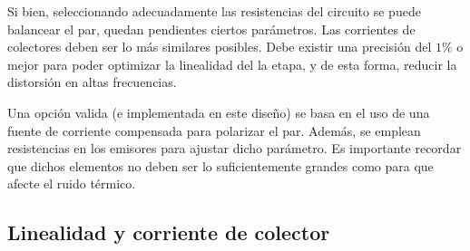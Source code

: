 Si bien, seleccionando adecuadamente las resistencias del circuito se puede balancear el par, quedan pendientes ciertos parámetros. Las corrientes de colectores deben ser lo más similares posibles. Debe existir una precisión del $1\%$ o mejor para poder optimizar la linealidad del la etapa, y de esta forma, reducir la distorsión en altas frecuencias.
%

Una opción valida (e implementada en este diseño) se basa en el uso de una fuente de corriente compensada para polarizar el par. Además, se emplean resistencias en los emisores para ajustar dicho parámetro. Es importante recordar que dichos elementos no deben ser lo suficientemente grandes como para que afecte el ruido térmico.  

\subsection{Linealidad y corriente de colector}

